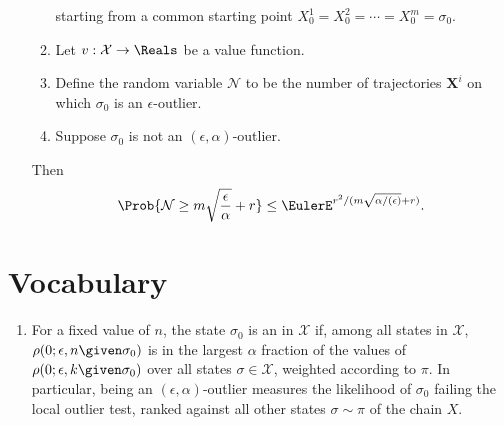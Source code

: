 \documentclass[12pt]{article}
\begin{document}
\begin{enumerate}
\begin{theorem}
\begin{enumerate}
                    starting from a common starting point \( X_0^1 = X_0^2
                    = \cdots = X_0^m = \sigma_0 \).
                \item
                    Let \( v :  \mathcal{X} \to \Reals \) be a value
                    function.
                \item
                    Define the random variable \( \mathcal{N} \) to be
                    the number of trajectories \( \mathbf{X}^i \) on
                    which \( \sigma_0 \) is an \( \epsilon \)-outlier.
                \item
                    Suppose \( \sigma_0 \) is not an \( (\epsilon,
                    \alpha) \)-outlier.
            \end{enumerate}
            Then
            \[
                \Prob{\mathcal{N} \ge m \sqrt{\frac{\epsilon}{\alpha}} +
                r} \le \EulerE^{r^2/( m \sqrt{\alpha/(\epsilon)} + r)}.
            \]
        \end{theorem}
\end{enumerate}
\renewcommand{\theenumii}{\alph{enumii}}

\hr

\section*{Vocabulary}
\begin{enumerate}
    \item
        For a fixed value of \( n \), the state \( \sigma_0 \) is an
         in \( \mathcal{X} \) if,
        among all states in \( \mathcal{X} \), \( \rho(0; \epsilon, n
        \given \sigma_{0}) \) is in the largest \( \alpha \) fraction of
        the values of \( \rho(0; \epsilon, k \given \sigma_{0}) \) over
        all states \( \sigma \in \mathcal{X} \), weighted according to \(
        \pi \).  In particular, being an \( (\epsilon, \alpha) \)-outlier
        measures the likelihood of \( \sigma_0 \) failing the local
        outlier test, ranked against all other states \( \sigma \sim \pi
        \) of the chain \( X \).
\end{enumerate}

\hr
\end{document}
